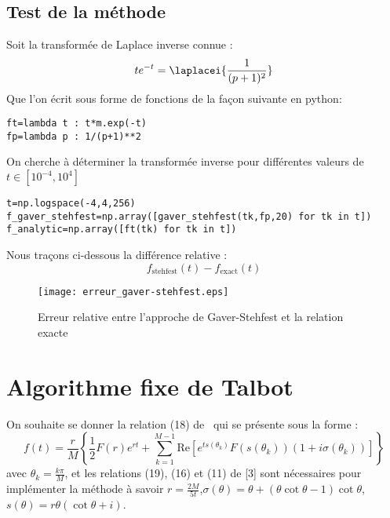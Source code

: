 \subsection*{Test de la méthode}
Soit la transformée de Laplace inverse connue :
\[
    te^{-t}=\laplacei{\dfrac{1}{(p+1)^2}}
\]
Que l'on écrit sous forme de fonctions de la façon suivante en python:
\begin{verbatim}
ft=lambda t : t*m.exp(-t)
fp=lambda p : 1/(p+1)**2
\end{verbatim}
On cherche à déterminer la transformée inverse pour différentes valeurs
de $t\in[10^{-4},10^4]$  
\begin{verbatim}
t=np.logspace(-4,4,256)
f_gaver_stehfest=np.array([gaver_stehfest(tk,fp,20) for tk in t])
f_analytic=np.array([ft(tk) for tk in t])
\end{verbatim}
Nous traçons ci-dessous la différence relative :
\[
    f_{\textrm{stehfest}}(t) - f_{\textrm{exact}}(t) 
\]

\begin{figure}[!b]
    \centering
    \texttt{[image: erreur\_gaver-stehfest.eps]}
    \caption{Erreur relative entre l'approche de Gaver-Stehfest et 
             la relation exacte}
\end{figure}
\clearpage
\section{Algorithme fixe de Talbot}
On souhaite se donner la relation (18) de~\cite{abate2004} 
qui se présente sous la forme :
\[
f(t) = \dfrac{r}{M} 
\left\{ 
    \dfrac{1}{2} F(r) e^{rt}+ \sum_{k=1}^{M-1} 
    \textrm{Re}\left[ e^{ts(\theta_k)} F(s(\theta_k)) (1+i\sigma(\theta_k))\right]
\right\}
\]
avec $\theta_k=\frac{k\pi}{M}$, et les relations (19), (16) et (11) de [3] 
sont nécessaires pour implémenter la méthode à savoir 
$r=\frac{2M}{5t}$,$\sigma(\theta)=\theta+(\theta\cot\theta-1)\cot\theta$,
$s(\theta)=r\theta(\cot\theta+i)$.
\inputminted{python}{codes/python/talbot-annexe_invL.py}
